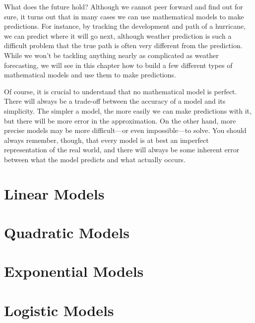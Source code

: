 \documentclass[9pt,letter,twoside,openright]{memoir}
\begin{document}
What does the future hold?  Although we cannot peer forward and find out for sure, it turns out that in many cases we can use mathematical models to make predictions.  For instance, by tracking the development and path of a hurricane, we can predict where it will go next, although weather prediction is such a difficult problem that the true path is often very different from the prediction.  While we won't be tackling anything nearly as complicated as weather forecasting, we will see in this chapter how to build a few different types of mathematical models and use them to make predictions.

Of course, it is crucial to understand that no mathematical model is perfect.  There will always be a trade-off between the accuracy of a model and its simplicity.  The simpler a model, the more easily we can make predictions with it, but there will be more error in the approximation.  On the other hand, more precise models may be more difficult---or even impossible---to solve.  You should always remember, though, that every model is at best an imperfect representation of the real world, and there will always be some inherent error between what the model predicts and what actually occurs.
\vfill
\pagebreak

\section{Linear Models}



\section{Quadratic Models}



\section{Exponential Models}



\section{Logistic Models}


\end{document}
